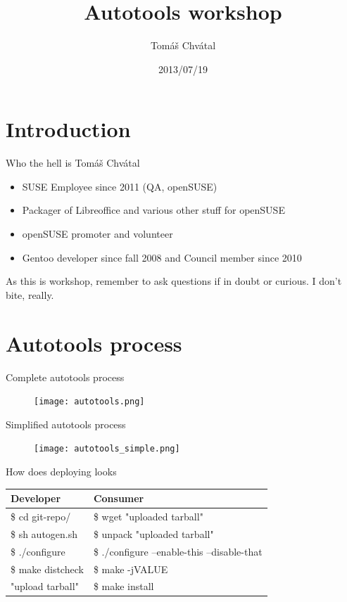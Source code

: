 \documentclass{beamer}
\author{Tom\'{a}\v{s} Chv\'{a}tal\newline {\small openSUSE Team}}
\title{Autotools workshop}
\date{2013/07/19}
\begin{document}
\begin{frame}[t,plain]
\titlepage
\end{frame}

\section{Introduction}

\begin{frame}[t]{Who the hell is Tomáš Chvátal}
	\begin{itemize}
	\item SUSE Employee since 2011 (QA, openSUSE)
	\item Packager of Libreoffice and various other stuff for openSUSE
	\item openSUSE promoter and volunteer
	\item Gentoo developer since fall 2008 and Council member since 2010
	\end{itemize}
	\begin{center}As this is workshop, remember to ask questions if in doubt or curious. I don't bite, really.\end{center}
\end{frame}

\section{Autotools process}

\begin{frame}{Complete autotools process}
	\begin{figure}
	\texttt{[image: autotools.png]}
	\end{figure}
\end{frame}

\begin{frame}{Simplified autotools process}
	\begin{figure}
	\texttt{[image: autotools\_simple.png]}
	\end{figure}
\end{frame}

\begin{frame}{How does deploying looks}
	\begin{tabular}{|l|l|}
	\toprule
	Developer & Consumer \\
	\midrule
	\$ cd git-repo/ & \$ wget "uploaded tarball" \\
	\$ sh autogen.sh & \$ unpack "uploaded tarball" \\
	\$ ./configure & \$ ./configure --enable-this --disable-that \\
	\$ make distcheck & \$ make -jVALUE \\
	"upload tarball" & \$ make install \\
	\bottomrule
	\end{tabular}
\end{frame}
\end{document}
